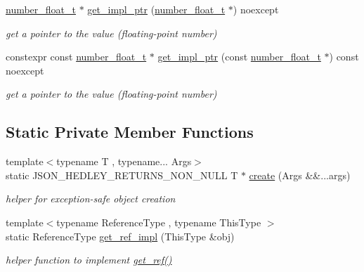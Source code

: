 \begin{DoxyCompactItemize}
\hyperlink{classnlohmann_1_1basic__json_a88d6103cb3620410b35200ee8e313d97}{number\+\_\+float\+\_\+t} $\ast$ \hyperlink{classnlohmann_1_1basic__json_a01e81365c2c6897b39b793530e02aca5}{get\+\_\+impl\+\_\+ptr} (\hyperlink{classnlohmann_1_1basic__json_a88d6103cb3620410b35200ee8e313d97}{number\+\_\+float\+\_\+t} $\ast$) noexcept
\begin{DoxyCompactList}\small\item\em get a pointer to the value (floating-\/point number) \end{DoxyCompactList}\item 
constexpr const \hyperlink{classnlohmann_1_1basic__json_a88d6103cb3620410b35200ee8e313d97}{number\+\_\+float\+\_\+t} $\ast$ \hyperlink{classnlohmann_1_1basic__json_abbec23daef5fbb5b8bff6a481e5a7160}{get\+\_\+impl\+\_\+ptr} (const \hyperlink{classnlohmann_1_1basic__json_a88d6103cb3620410b35200ee8e313d97}{number\+\_\+float\+\_\+t} $\ast$) const noexcept
\begin{DoxyCompactList}\small\item\em get a pointer to the value (floating-\/point number) \end{DoxyCompactList}\end{DoxyCompactItemize}
\subsection*{Static Private Member Functions}
\begin{DoxyCompactItemize}
\item 
{\footnotesize template$<$typename T , typename... Args$>$ }\\static J\+S\+O\+N\+\_\+\+H\+E\+D\+L\+E\+Y\+\_\+\+R\+E\+T\+U\+R\+N\+S\+\_\+\+N\+O\+N\+\_\+\+N\+U\+LL T $\ast$ \hyperlink{classnlohmann_1_1basic__json_a39c5d800f9ceb5912648ddce4e9326ce}{create} (Args \&\&...args)
\begin{DoxyCompactList}\small\item\em helper for exception-\/safe object creation \end{DoxyCompactList}\item 
{\footnotesize template$<$typename Reference\+Type , typename This\+Type $>$ }\\static Reference\+Type \hyperlink{classnlohmann_1_1basic__json_a040a5feb1eb48da9134924217b25bcf6}{get\+\_\+ref\+\_\+impl} (This\+Type \&obj)
\begin{DoxyCompactList}\small\item\em helper function to implement \hyperlink{classnlohmann_1_1basic__json_afbd800010b67619463c0fce6e74f7878}{get\+\_\+ref()} \end{DoxyCompactList}\end{DoxyCompactItemize}
